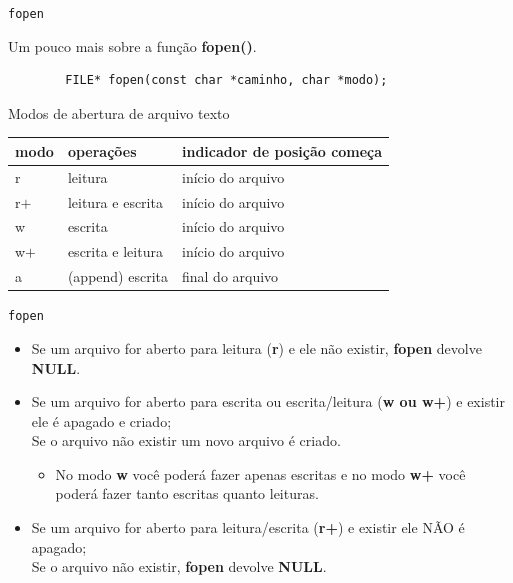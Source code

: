 \documentclass[handout]{beamer}
\begin{document}
\begin{frame}[fragile]{\texttt{fopen}}

    Um pouco mais sobre a função \textbf{fopen()}.

    \begin{verbatim}
        FILE* fopen(const char *caminho, char *modo);
    \end{verbatim}

    \begin{block}{Modos de abertura de arquivo texto}
        \begin{center}
            \begin{tabular}{|l|l|l|} \hline
              \textbf{modo} & \textbf{operações} & \textbf{indicador de posição começa}  \\\hline
              r & leitura & início do arquivo\\\hline
              r$+$ & leitura e escrita & início do arquivo\\\hline
              w & escrita & início do arquivo \\\hline
              w$+$ & escrita  e leitura & início do arquivo \\\hline
              a & (append) escrita & final do arquivo \\\hline
            \end{tabular}
        \end{center}
    \end{block}

\end{frame}

\begin{frame}[fragile]{\texttt{fopen}}
    \begin{itemize}
        \item Se um arquivo for aberto para leitura (\textbf{r}) e ele não existir, \textbf{fopen} devolve \textbf{NULL}.
        \item Se um arquivo for aberto para escrita ou escrita/leitura (\textbf{w ou w+}) e existir ele é apagado e criado; \\
        Se o arquivo não existir um novo arquivo  é criado.
        \begin{itemize}
            \item No modo \textbf{w} você poderá fazer apenas escritas e no modo \textbf{w+} você poderá fazer
            tanto escritas quanto leituras.
        \end{itemize}
        \item Se um arquivo for aberto para leitura/escrita (\textbf{r+}) e existir ele NÃO é apagado; \\
        Se o arquivo não existir, \textbf{fopen} devolve \textbf{NULL}.
    \end{itemize}
\end{frame}
\end{document}
